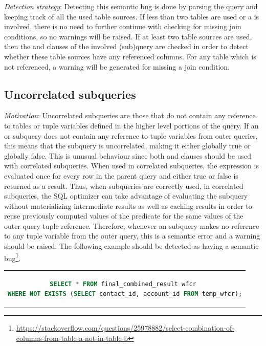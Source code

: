 \noindent \emph{Detection strategy}: Detecting this semantic bug is done by parsing the query and keeping track of all the used table sources. If less than two tables are used or a  is involved, there is no need to further continue with checking for missing join conditions, so no warnings will be raised. If at least two table sources are used, then the  and  clauses of the involved (sub)query are checked in order to detect whether these table sources have any referenced columns. For any table which is not referenced, a warning will be generated for missing a join condition.

\subsection{Uncorrelated  subqueries}
\emph{Motivation}: Uncorrelated subqueries are those that do not contain any reference to tables or tuple variables defined in the higher level portions of the query. If an  or  subquery does not contain any reference to tuple variables from outer queries, this means that the subquery is uncorrelated, making it either globally true or globally false. This is unusual behaviour since both  and  clauses should be used with correlated subqueries. When used in correlated subqueries, the expression is evaluated once for every row in the parent query and either true or false is returned as a result. Thus, when  subqueries are correctly used, in correlated subqueries, the SQL optimizer can take advantage of evaluating the subquery without materializing intermediate results as well as caching results in order to reuse previously computed values of the predicate for the same values of the outer query tuple reference. Therefore, whenever an  subquery makes no reference to any tuple variable from the outer query, this is a semantic error and a warning should be raised. The following example should be detected as having a semantic bug\footnote{\url{https://stackoverflow.com/questions/25978882/select-combination-of-columns-from-table-a-not-in-table-b}}.

\begin{center}
\begin{tabular}{c}
\begin{lstlisting}[language=SQL]
SELECT * FROM final_combined_result wfcr 
WHERE NOT EXISTS (SELECT contact_id, account_id FROM temp_wfcr);
\end{lstlisting}
\end{tabular}
\end{center}

